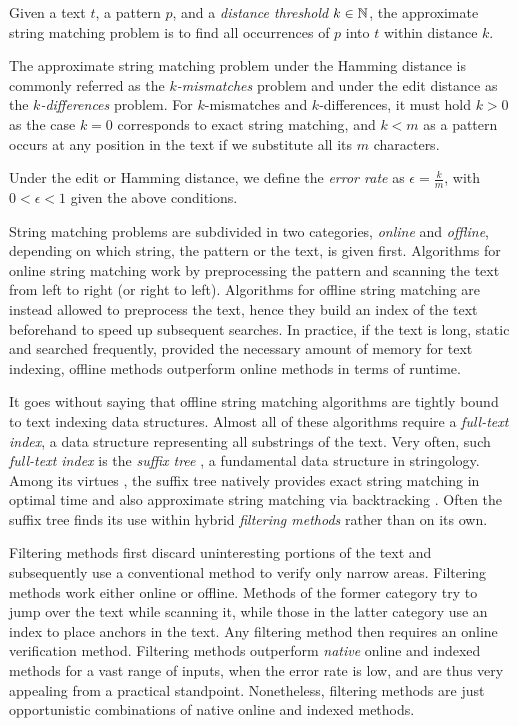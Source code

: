 \begin{definition}
Given a text $t$, a pattern $p$, and a \emph{distance threshold} $k \in \mathbb {N}$, the approximate string matching problem is to find all occurrences of $p$ into $t$ within distance $k$.
\end{definition}
The approximate string matching problem under the Hamming distance is commonly referred as the \emph{$k$-mismatches} problem and under the edit distance as the \emph{$k$-differences} problem.
For $k$-mismatches and $k$-differences, it must hold $k > 0$ as the case $k = 0$ corresponds to exact string matching, and $k < m$ as a pattern occurs at any position in the text if we substitute all its $m$ characters.
\begin{definition}
Under the edit or Hamming distance, we define the \emph{error rate} as $\epsilon = \frac{k}{m}$, with $0 < \epsilon < 1$ given the above conditions.
\end{definition}

String matching problems are subdivided in two categories, \emph{online} and \emph{offline}, depending on which string, the pattern or the text, is given first.
Algorithms for online string matching work by preprocessing the pattern and scanning the text from left to right (or right to left).
Algorithms for offline string matching are instead allowed to preprocess the text,
hence they build an index of the text beforehand to speed up subsequent searches.
In practice, if the text is long, static and searched frequently, provided the necessary amount of memory for text indexing, offline methods outperform online methods in terms of runtime.

It goes without saying that offline string matching algorithms are tightly bound to text indexing data structures.
Almost all of these algorithms require a \emph{full-text index}, \ie a data structure representing all substrings of the text.
Very often, such \emph{full-text index} is the \emph{suffix tree} \citep{Weiner1973}, a fundamental data structure in stringology.
Among its virtues \citep{Apostolico?}, the suffix tree natively provides exact string matching in optimal time and also approximate string matching via backtracking \citep{Ukkonen?}.
Often the suffix tree finds its use within hybrid \emph{filtering methods} rather than on its own.

Filtering methods first discard uninteresting portions of the text and subsequently use a conventional method to verify only narrow areas.
Filtering methods work either online or offline.
Methods of the former category try to jump over the text while scanning it, while those in the latter category use an index to place anchors in the text.
Any filtering method then requires an online verification method.
Filtering methods outperform \emph{native} online and indexed methods for a vast range of inputs, \eg when the error rate is low, and are thus very appealing from a practical standpoint.
Nonetheless, filtering methods are just opportunistic combinations of native online and indexed methods.

